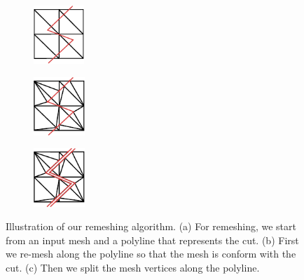 \begin{figure}[p]
\centering
\begin{subfigure}[c]{0.3\linewidth}
\centering
\includegraphics[height=2.2cm]{images/cutting-mig2015/remeshing_1.pdf}
\caption{\label{fig:remeshing1}}
\end{subfigure}
\hfill
\begin{subfigure}[c]{0.3\linewidth}
\centering
\includegraphics[height=2.2cm]{images/cutting-mig2015/remeshing_2.pdf}
\caption{\label{fig:remeshing2}}
\end{subfigure}
\hfill
\begin{subfigure}[c]{0.3\linewidth}
\centering
\includegraphics[height=2.2cm]{images/cutting-mig2015/remeshing_3.pdf}
\caption{\label{fig:remeshing3}}
\end{subfigure}
\caption[Frame-based cutting: Remeshing algorithm]{\label{fig:remeshing} Illustration of our remeshing algorithm. (a) For remeshing, we start from an input mesh and a polyline that represents the cut. (b) First we re-mesh along the polyline so that the mesh is conform with the cut. (c) Then we split the mesh vertices along the polyline.}
\end{figure}

